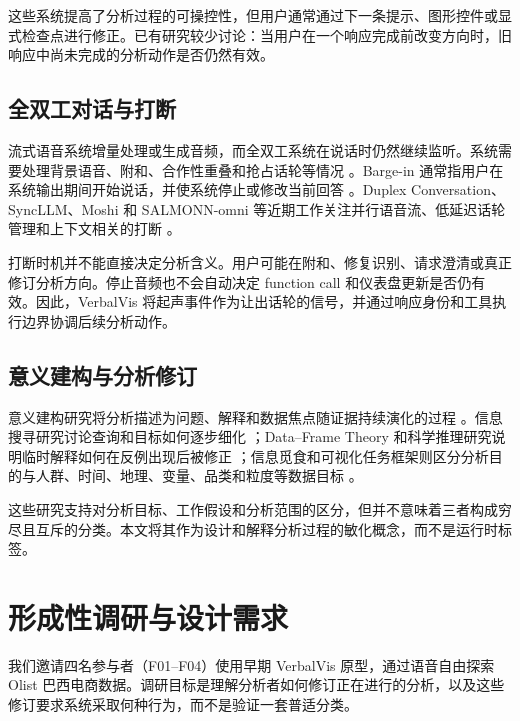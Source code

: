 \documentclass[UTF8,a4paper,10.5pt]{ctexart}
\begin{document}
这些系统提高了分析过程的可操控性，但用户通常通过下一条提示、图形控件或显式检查点进行修正。已有研究较少讨论：当用户在一个响应完成前改变方向时，旧响应中尚未完成的分析动作是否仍然有效。

\subsection{全双工对话与打断}

流式语音系统增量处理或生成音频，而全双工系统在说话时仍然继续监听。系统需要处理背景语音、附和、合作性重叠和抢占话轮等情况 \cite{skantze2021turntaking}。Barge-in 通常指用户在系统输出期间开始说话，并使系统停止或修改当前回答 \cite{heins1997bargein}。Duplex Conversation、SyncLLM、Moshi 和 SALMONN-omni 等近期工作关注并行语音流、低延迟话轮管理和上下文相关的打断 \cite{lin2022duplex,veluri2024syncllm,defossez2024moshi,yu2025salmonnomni}。

打断时机并不能直接决定分析含义。用户可能在附和、修复识别、请求澄清或真正修订分析方向。停止音频也不会自动决定 function call 和仪表盘更新是否仍有效。因此，VerbalVis 将起声事件作为让出话轮的信号，并通过响应身份和工具执行边界协调后续分析动作。

\subsection{意义建构与分析修订}

意义建构研究将分析描述为问题、解释和数据焦点随证据持续演化的过程 \cite{russell1993cost,pirolli2005sensemaking,sacha2014knowledge}。信息搜寻研究讨论查询和目标如何逐步细化 \cite{bates1989berrypicking,vakkari2001changes,battle2019characterizing}；Data--Frame Theory 和科学推理研究说明临时解释如何在反例出现后被修正 \cite{klein2007dataframe,klahr1988dual,chinn1993anomalous}；信息觅食和可视化任务框架则区分分析目的与人群、时间、地理、变量、品类和粒度等数据目标 \cite{pirolli1999information,brehmer2013multilevel,wongsuphasawat2016voyager}。

这些研究支持对分析目标、工作假设和分析范围的区分，但并不意味着三者构成穷尽且互斥的分类。本文将其作为设计和解释分析过程的敏化概念，而不是运行时标签。

\section{形成性调研与设计需求}

我们邀请四名参与者（F01--F04）使用早期 VerbalVis 原型，通过语音自由探索 Olist 巴西电商数据。调研目标是理解分析者如何修订正在进行的分析，以及这些修订要求系统采取何种行为，而不是验证一套普适分类。
\end{document}
